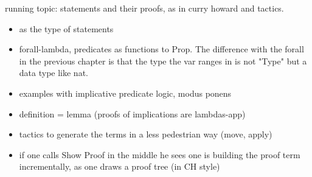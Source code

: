 
%
%
%

running topic: statements and their proofs, as in curry howard and
tactics.

\begin{itemize}
\item {} as the type of statements
\item forall-lambda, predicates as functions to Prop.  The difference with the forall in the previous chapter is that the type the var ranges in is not "Type" but a data type like nat.
\item examples with implicative predicate logic, modus ponens
\item definition = lemma (proofs of implications are lambdas-app)
\item tactics to generate the terms in a less pedestrian way (move, apply)
\item if one calls Show Proof in the middle he sees one is building
	the proof term incrementally, as one draws a proof tree (in CH style)
\end{itemize}

